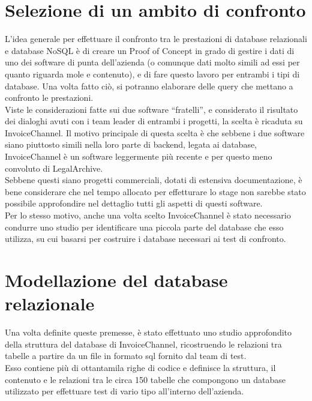 \section{Selezione di un ambito di confronto}
L'idea generale per effettuare il confronto tra le prestazioni di database relazionali e database NoSQL è di creare un Proof of Concept in grado di gestire i dati di uno dei software di punta dell'azienda (o comunque dati molto simili ad essi per quanto riguarda mole e contenuto), e di fare questo lavoro per entrambi i tipi di database. Una volta fatto ciò, si potranno elaborare delle query che mettano a confronto le prestazioni.\\

\noindent Viste le considerazioni fatte sui due software ``fratelli'', e considerato il risultato dei dialoghi avuti con i team leader di entrambi i progetti, la scelta è ricaduta su InvoiceChannel. Il motivo principale di questa scelta è che sebbene i due software siano piuttosto simili nella loro parte di backend, legata ai database, InvoiceChannel è un software leggermente più recente e per questo meno convoluto di LegalArchive.\\
Sebbene questi siano progetti commerciali, dotati di estensiva documentazione, è bene considerare che nel tempo allocato per effetturare lo stage non sarebbe stato possibile approfondire nel dettaglio tutti gli aspetti di questi software.\\
Per lo stesso motivo, anche una volta scelto InvoiceChannel è stato necessario condurre uno studio per identificare una piccola parte del database che esso utilizza, su cui basarsi per costruire i database necessari ai test di confronto.\\


\section{Modellazione del database relazionale}
Una volta definite queste premesse, è stato effettuato uno studio approfondito della struttura del database di InvoiceChannel, ricostruendo le relazioni tra tabelle a partire da un file in formato sql fornito dal team di test.\\
Esso contiene più di ottantamila righe di codice e definisce la struttura, il contenuto e le relazioni tra le circa 150 tabelle che compongono un database utilizzato per effettuare test di vario tipo all'interno dell'azienda.\\

